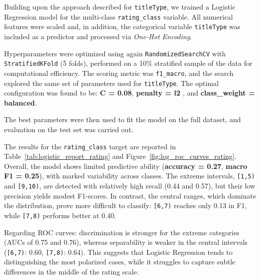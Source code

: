 Building upon the approach described for \texttt{titleType}, we trained a 
Logistic Regression model for the multi-class \texttt{rating\_class} variable. 
All numerical features were scaled and, in addition, the categorical variable 
\texttt{titleType} was included as a predictor and processed via \textit{One-Hot Encoding}.

Hyperparameters were optimized using again \texttt{RandomizedSearchCV} with \texttt{StratifiedKFold} (5 folds), 
performed on a 10\% stratified sample of the data for computational efficiency. 
The scoring metric was \texttt{f1\_macro}, and the search explored the same set of parameters used for \texttt{titleType}. 
The optimal configuration was found to be: \textbf{C = 0.08}, \textbf{penalty = l2 }, and \textbf{class\_weight = balanced}.

The best parameters were then used to fit the model on the full dataset, and evaluation on the test set was carried out. 



The results for the \texttt{rating\_class} target are reported in 
Table~\ref{tab:logistic_report_rating} and Figure~\ref{fig:log_roc_curves_rating}. 
Overall, the model shows limited predictive ability 
(\textbf{accuracy = 0.27}, \textbf{macro F1 = 0.25}), with marked variability across classes. 
The extreme intervals, \texttt{[1,5)} and \texttt{[9,10)}, are detected with relatively high recall 
(0.44 and 0.57), but their low precision yields modest F1-scores. 
In contrast, the central ranges, which dominate the distribution, prove more difficult to classify: 
\texttt{[6,7)} reaches only 0.13 in F1, while \texttt{[7,8)} performs better at 0.40. 

Regarding ROC curves: discrimination is stronger for the extreme categories 
(AUCs of 0.75 and 0.76), whereas separability is weaker in the central intervals 
(\texttt{[6,7)}: 0.60, \texttt{[7,8)}: 0.64). 
This suggests that Logistic Regression tends to distinguishing the most polarized cases,
while it struggles to capture subtle differences in the middle of the rating scale.
 

